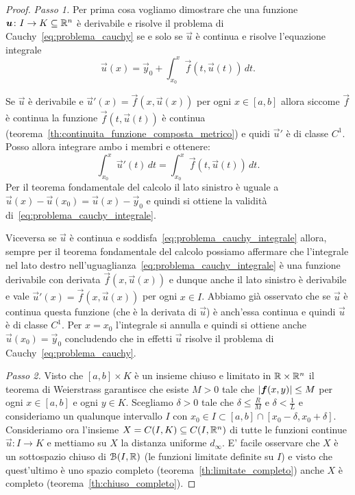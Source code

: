 \begin{proof}
  \emph{Passo 1.}
  Per prima cosa vogliamo dimostrare che una funzione $\boldsymbol u\colon I\to K\subseteq {\mathbb R}^n$
  è derivabile e risolve il problema di Cauchy~\eqref{eq:problema_cauchy} 
  se e solo se 
  $\vec u$ è continua e risolve l'equazione integrale
  \begin{equation}\label{eq:problema_cauchy_integrale}
  \vec u(x) = \vec y_0 + \int_{x_0}^x \vec f(t,\vec u(t))\, dt.
  \end{equation}

  Se $\vec u$ è derivabile e 
  $\vec u'(x) = \vec f(x, \vec u(x))$ per ogni $x\in[a,b]$ allora 
  siccome $\vec f$ è continua la funzione $\vec f(t,\vec u(t))$ è continua 
  (teorema~\ref{th:continuita_funzione_composta_metrico})
  e quidi $\vec u'$ è di classe $C^1$. 
  Posso allora integrare ambo i membri 
  e ottenere:
  \[
   \int_{x_0}^x \vec u'(t)\, dt = \int_{x_0}^x \vec f(t,\vec u(t))\, dt.  
  \]
  Per il teorema fondamentale del calcolo il lato sinistro è uguale 
  a $\vec u(x) - \vec u(x_0) = \vec u(x) - \vec y_0$ e quindi si ottiene 
  la validità di~\eqref{eq:problema_cauchy_integrale}.

  Viceversa se $\vec u$ è continua e soddisfa~\eqref{eq:problema_cauchy_integrale}
  allora, sempre per il teorema fondamentale del calcolo possiamo affermare
  che l'integrale nel lato destro nell'uguaglianza~\eqref{eq:problema_cauchy_integrale}
  è una funzione derivabile con derivata $\vec f(x,\vec u(x))$ e dunque anche 
  il lato sinistro è derivabile e vale $\vec u'(x) = \vec f(x,\vec u(x))$ per 
  ogni $x\in I$. 
  Abbiamo già osservato che se $\vec u$ è continua questa funzione (che è la derivata 
  di $\vec u$) è anch'essa continua e quindi $\vec u$ è di classe $C^1$.
  Per $x=x_0$ l'integrale si annulla e quindi si ottiene 
  anche $\vec u(x_0) = \vec y_0$ concludendo che in effetti $\vec u$ risolve 
  il problema di Cauchy~\eqref{eq:problema_cauchy}.

  \emph{Passo 2.}
  Visto che $[a,b]\times K$ è un insieme chiuso e limitato in ${\mathbb R} \times {\mathbb R}^n$ 
  il teorema di Weierstrass garantisce che esiste $M>0$ tale che 
  ${\left|\boldsymbol f(x,y)\right|}\le M$ per ogni $x\in [a,b]$ e ogni $y\in K$.
  Scegliamo $\delta >0$ tale che $\delta \le \frac{R}{M}$ e $\delta < \frac {1}{L}$
  e consideriamo un qualunque intervallo $I$ con $x_0\in I \subset [a,b]\cap [x_0-\delta,x_0+\delta]$.
  Consideriamo ora l'insieme $X=C(I,K)\subseteq C(I,{\mathbb R}^n)$ di tutte le funzioni continue $\vec u\colon I\to K$
  e mettiamo su $X$ la distanza uniforme $d_\infty$.
  E' facile osservare che $X$ è un sottospazio chiuso di $\mathcal B(I,{\mathbb R})$ (le funzioni limitate definite su $I$)
  e visto che quest'ultimo è uno spazio completo (teorema~\ref{th:limitate_completo}) anche $X$ 
  è completo (teorema~\ref{th:chiuso_completo}).


\end{proof}
